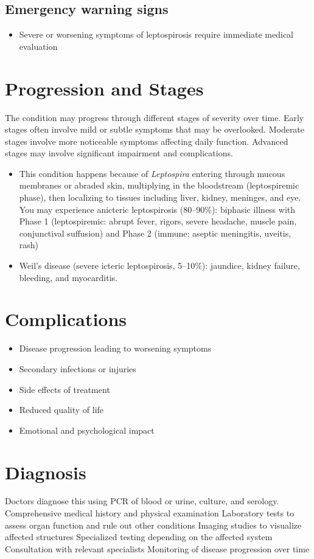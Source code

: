 \subsection{Emergency warning signs}
\begin{itemize}[noitemsep]
  \item Severe or worsening symptoms of leptospirosis require immediate medical evaluation
\end{itemize}
\section{Progression and Stages}
The condition may progress through different stages of severity over time. Early stages often involve mild or subtle symptoms that may be overlooked. Moderate stages involve more noticeable symptoms affecting daily function. Advanced stages may involve significant impairment and complications.

\begin{itemize}[noitemsep]
  \item This condition happens because of \textit{Leptospira} entering through mucous membranes or abraded skin, multiplying in the bloodstream (leptospiremic phase), then localizing to tissues including liver, kidney, meninges, and eye. You may experience anicteric leptospirosis (80--90\%): biphasic illness with Phase 1 (leptospiremic: abrupt fever, rigors, severe headache, muscle pain, conjunctival suffusion) and Phase 2 (immune: aseptic meningitis, uveitis, rash)
  \item Weil's disease (severe icteric leptospirosis, 5--10\%): jaundice, kidney failure, bleeding, and myocarditis.
\end{itemize}
\section{Complications}
\begin{itemize}[noitemsep]
  \item Disease progression leading to worsening symptoms
  \item Secondary infections or injuries
  \item Side effects of treatment
  \item Reduced quality of life
  \item Emotional and psychological impact
\end{itemize}
\section{Diagnosis}
Doctors diagnose this using PCR of blood or urine, culture, and serology. Comprehensive medical history and physical examination Laboratory tests to assess organ function and rule out other conditions Imaging studies to visualize affected structures Specialized testing depending on the affected system Consultation with relevant specialists Monitoring of disease progression over time

